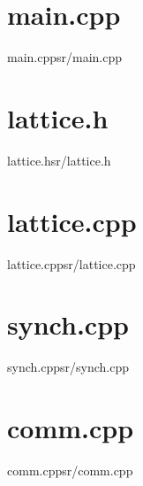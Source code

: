 
\section{main.cpp}
\begin{code}{main.cpp}{sr/main.cpp}

\end{code}

\section{lattice.h}
\begin{code}{lattice.h}{sr/lattice.h}

\end{code}

\section{lattice.cpp}
\begin{code}{lattice.cpp}{sr/lattice.cpp}

\end{code}

\section{synch.cpp}
\begin{code}{synch.cpp}{sr/synch.cpp}

\end{code}

\section{comm.cpp}
\begin{code}{comm.cpp}{sr/comm.cpp}

\end{code}